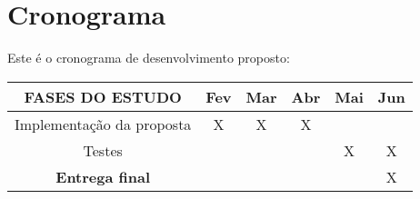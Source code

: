 %
%

\chapter{Cronograma}

Este é o cronograma de desenvolvimento proposto:

\begin{samepage}
\begin{tabular}{|c|c|c|c|c|c|}
\hline
FASES DO ESTUDO & Fev & Mar & Abr & Mai & Jun \\
\hline
Implementação da proposta & X & X & X & & \\
\hline
Testes &   &   &   & X & X \\
\hline
\textbf{Entrega final} &   &   &   &   & X \\
\hline
\end{tabular}
\end{samepage}
